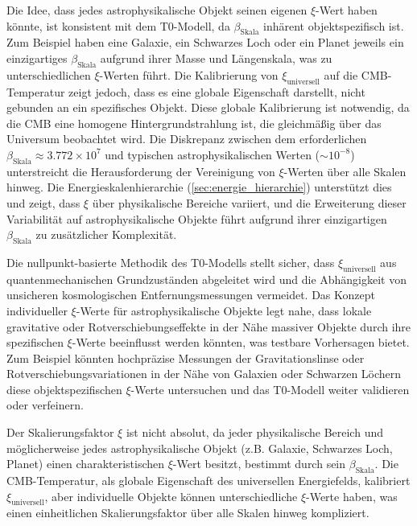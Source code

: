 \documentclass[12pt,a4paper]{report}
\newcommand{\xipar}{\xi}
\newcommand{\xiuniversal}{\xi_{\text{universell}}}
\newcommand{\betascale}{\beta_{\text{Skala}}}
\theoremstyle{definition}
\begin{document}
	Die Idee, dass jedes astrophysikalische Objekt seinen eigenen $\xipar$-Wert haben könnte, ist konsistent mit dem T0-Modell, da $\betascale$ inhärent objektspezifisch ist. Zum Beispiel haben eine Galaxie, ein Schwarzes Loch oder ein Planet jeweils ein einzigartiges $\betascale$ aufgrund ihrer Masse und Längenskala, was zu unterschiedlichen $\xipar$-Werten führt. Die Kalibrierung von $\xiuniversal$ auf die CMB-Temperatur zeigt jedoch, dass es eine globale Eigenschaft darstellt, nicht gebunden an ein spezifisches Objekt. Diese globale Kalibrierung ist notwendig, da die CMB eine homogene Hintergrundstrahlung ist, die gleichmäßig über das Universum beobachtet wird. Die Diskrepanz zwischen dem erforderlichen $\betascale \approx 3.772 \times 10^7$ und typischen astrophysikalischen Werten ($\sim 10^{-8}$) unterstreicht die Herausforderung der Vereinigung von $\xipar$-Werten über alle Skalen hinweg. Die Energieskalenhierarchie (\cref{sec:energie_hierarchie}) unterstützt dies und zeigt, dass $\xipar$ über physikalische Bereiche variiert, und die Erweiterung dieser Variabilität auf astrophysikalische Objekte führt aufgrund ihrer einzigartigen $\betascale$ zu zusätzlicher Komplexität.
	
	Die nullpunkt-basierte Methodik des T0-Modells stellt sicher, dass $\xiuniversal$ aus quantenmechanischen Grundzuständen abgeleitet wird und die Abhängigkeit von unsicheren kosmologischen Entfernungsmessungen vermeidet. Das Konzept individueller $\xipar$-Werte für astrophysikalische Objekte legt nahe, dass lokale gravitative oder Rotverschiebungseffekte in der Nähe massiver Objekte durch ihre spezifischen $\xipar$-Werte beeinflusst werden könnten, was testbare Vorhersagen bietet. Zum Beispiel könnten hochpräzise Messungen der Gravitationslinse oder Rotverschiebungsvariationen in der Nähe von Galaxien oder Schwarzen Löchern diese objektspezifischen $\xipar$-Werte untersuchen und das T0-Modell weiter validieren oder verfeinern.
	
	\begin{important}
		Der Skalierungsfaktor $\xipar$ ist nicht absolut, da jeder physikalische Bereich und möglicherweise jedes astrophysikalische Objekt (z.B. Galaxie, Schwarzes Loch, Planet) einen charakteristischen $\xipar$-Wert besitzt, bestimmt durch sein $\betascale$. Die CMB-Temperatur, als globale Eigenschaft des universellen Energiefelds, kalibriert $\xiuniversal$, aber individuelle Objekte können unterschiedliche $\xipar$-Werte haben, was einen einheitlichen Skalierungsfaktor über alle Skalen hinweg kompliziert.
	\end{important}
\end{document}
